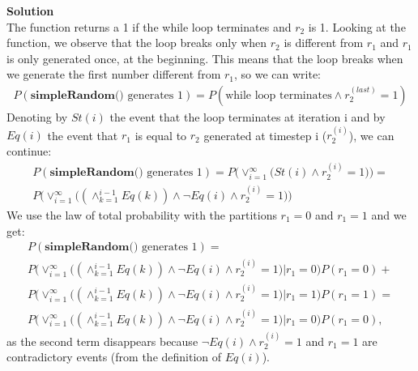 \documentclass[10pt,a4paper,oneside,draft]{report}
\begin{document}
\textbf{Solution} \\

The function returns a 1 if the while loop terminates and $r_2$ is 1. Looking at the function, we observe that the loop breaks only when $r_2$ is different from $r_1$ and $r_1$ is only generated once, at the beginning. This means that the loop breaks when we generate the first number different from $r_1$, so we can write: \\
\begin{gather*}
P(\textbf{simpleRandom() } \text{generates 1}) = P(\text{while loop terminates} \land r_2^{(last)} = 1)
\end{gather*}
Denoting by $St(i)$ the event that the loop terminates at iteration i and by $Eq(i)$ the event that $r_1$ is equal to $r_2$ generated at timestep i ($r_2^{(i)}$), we can continue: \\
\begin{gather*}
P(\textbf{simpleRandom() } \text{generates 1}) = P\Big( \lor_{i=1}^{\infty} \big( St(i) \land r_2^{(i)} = 1 \big) \Big) = \\
P\Big( \lor_{i=1}^{\infty} \big( (\land_{k=1}^{i-1} Eq(k)) \land \neg Eq(i) \land r_2^{(i)} = 1 \big) \Big)
\end{gather*}
We use the law of total probability with the partitions $r_1=0$ and $r_1=1$ and we get:
\begin{gather*}
P(\textbf{simpleRandom() } \text{generates 1}) = \\
P\Big( \lor_{i=1}^{\infty} \big( (\land_{k=1}^{i-1} Eq(k)) \land \neg Eq(i) \land r_2^{(i)} = 1 \big) | r_1=0 \Big) P(r_1=0) + \\
P\Big( \lor_{i=1}^{\infty} \big( (\land_{k=1}^{i-1} Eq(k)) \land \neg Eq(i) \land r_2^{(i)} = 1 \big) | r_1=1 \Big) P(r_1=1) = \\
P\Big( \lor_{i=1}^{\infty} \big( (\land_{k=1}^{i-1} Eq(k)) \land \neg Eq(i) \land r_2^{(i)} = 1 \big) | r_1=0 \Big) P(r_1=0),
\end{gather*}
as the second term disappears because $\neg Eq(i) \land r_2^{(i)} = 1$ and $r_1=1$ are contradictory events (from the definition of $Eq(i)$).\\
\end{document}

